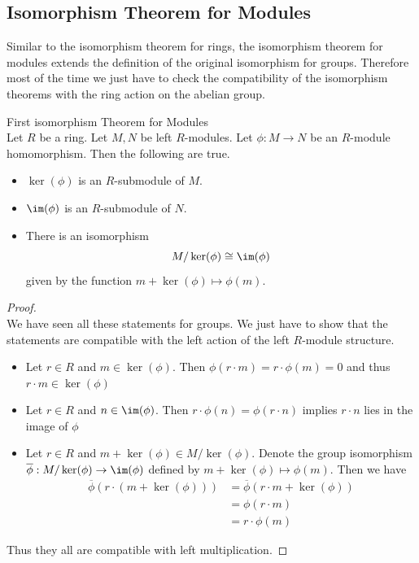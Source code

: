\documentclass[a4paper]{article}
\begin{document}
\subsection{Isomorphism Theorem for Modules}
Similar to the isomorphism theorem for rings, the isomorphism theorem for modules extends the definition of the original isomorphism for groups. Therefore most of the time we just have to check the compatibility of the isomorphism theorems with the ring action on the abelian group. 

\begin{thm}{First isomorphism Theorem for Modules}{}\\
Let $R$ be a ring. Let $M,N$ be left $R$-modules. Let $\phi:M\to N$ be an $R$-module homomorphism. Then the following are true. 
\begin{itemize}
\item $\ker(\phi)$ is an $R$-submodule of $M$. 
\item $\im(\phi)$ is an $R$-submodule of $N$. 
\item There is an isomorphism $$M/\ker(\phi)\cong\im(\phi)$$ given by the function $m+\ker(\phi)\mapsto\phi(m)$. 
\end{itemize}
\begin{proof}\\
We have seen all these statements for groups. We just have to show that the statements are compatible with the left action of the left $R$-module structure. 
\begin{itemize}
\item Let $r\in R$ and $m\in\ker(\phi)$. Then $\phi(r\cdot m)=r\cdot\phi(m)=0$ and thus $r\cdot m\in\ker(\phi)$
\item Let $r\in R$ and $n\in\im(\phi)$. Then $r\cdot\phi(n)=\phi(r\cdot n)$ implies $r\cdot n$ lies in the image of $\phi$
\item Let $r\in R$ and $m+\ker(\phi)\in M/\ker(\phi)$. Denote the group isomorphism $\overline{\phi}:M/\ker(\phi)\to\im(\phi)$ defined by $m+\ker(\phi)\mapsto\phi(m)$. Then we have 
\begin{align*}
\overline{\phi}(r\cdot(m+\ker(\phi)))&=\overline{\phi}(r\cdot m+\ker(\phi))\\
&=\phi(r\cdot m)\\
&=r\cdot\phi(m)
\end{align*}
\end{itemize}
Thus they all are compatible with left multiplication. 
\end{proof}
\end{thm}
\end{document}
